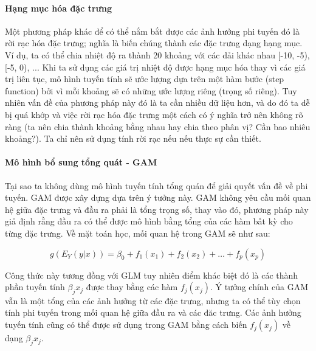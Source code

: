 \paragraph{Hạng mục hóa đặc trưng}
Một phương pháp khác để có thể nắm bắt được các ảnh hưởng phi tuyến đó là rời rạc hóa đặc trưng; nghĩa là biến chúng thành các đặc trưng dạng hạng mục. Ví dụ, ta có thể chia nhiệt độ ra thành 20 khoảng với các dải khác nhau [-10, -5), [-5, 0), ... Khi ta sử dụng các giá trị nhiệt độ được hạng mục hóa thay vì các giá trị liên tục, mô hình tuyến tính sẽ ước lượng dựa trên một hàm bước (step function) bởi vì mỗi khoảng sẽ có những ước lượng riêng (trọng số riêng). Tuy nhiên vấn đề của phương pháp này đó là ta cần nhiều dữ liệu hơn, và do đó ta dễ bị quá khớp và việc rời rạc hóa đặc trưng một cách có ý nghĩa trở nên không rõ ràng (ta nên chia thành khoảng bằng nhau hay chia theo phân vị? Cần bao nhiêu khoảng?). Ta chỉ nên sử dụng tính rời rạc nếu nếu thực sự cần thiết. 

\paragraph{Mô hình bổ sung tổng quát - GAM}

Tại sao ta không dùng mô hình tuyến tính tổng quán để giải quyết vấn đề về phi tuyến. GAM được xây dựng dựa trên ý tưởng này. GAM không yêu cầu mối quan hệ giữa đặc trưng và đầu ra phải là tổng trọng số, thay vào đó, phương pháp này giả định rằng đầu ra có thể được mô hình bằng tổng của các hàm bất kỳ cho từng đặc trưng. Về mặt toán học, mối quan hệ trong GAM sẽ như sau:

$$g(E_Y(y|x))=\beta_0+f_1(x_{1})+f_2(x_{2})+\ldots+f_p(x_{p})$$

Công thức này tương đồng với GLM tuy nhiên điểm khác biệt đó là các thành phần tuyến tính $\beta_j{}x_{j}$ được thay bằng các hàm $f_j(x_{j})$. Ý tưởng chính của GAM vẫn là một tổng của các ảnh hưởng từ các đặc trưng, nhưng ta có thể tùy chọn tính phi tuyến trong mối quan hệ giữa đầu ra và các đăc trưng. Các ảnh hưởng tuyến tính cũng có thể được sử dụng trong GAM bằng cách biến $f_j(x_{j})$ về dạng $\beta_j{}x_{j}$.

